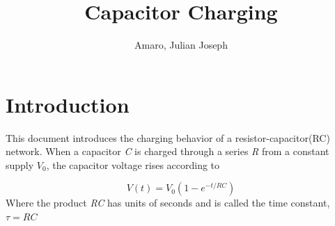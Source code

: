 \documentclass{article}
\title{Capacitor Charging}
\author{Amaro, Julian Joseph}
\begin{document}
\maketitle

\section{Introduction}
This document introduces the charging behavior of a resistor-capacitor(RC) network. When a capacitor \textit{C} is charged through a series \textit{R} from a constant supply $V_0$, the capacitor voltage rises according to
 
\[
V(t)=V_0(1-e^{-t/RC})
\]
Where the product \textit{RC} has units of seconds and is called the time constant, $\tau=RC$
\end{document}
